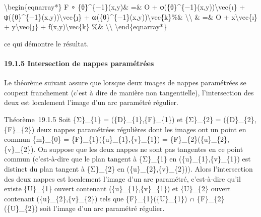 \documentclass[]{article}
\begin{document}
\textbackslash{}begin\{eqnarray*\} F ∘ \{θ\}\^{}\{−1\}(x,y)\& =\& O +
φ(\{θ\}\^{}\{−1\}(x,y))\textbackslash{}vec\{ı\} +
ψ(\{θ\}\^{}\{−1\}(x,y))\textbackslash{}vec\{ȷ\} +
ω(\{θ\}\^{}\{−1\}(x,y))\textbackslash{}vec\{k\}\%\&
\textbackslash{}\textbackslash{} \& =\& O + x\textbackslash{}vec\{ı\} +
y\textbackslash{}vec\{ȷ\} + f(x,y)\textbackslash{}vec\{k\} \%\&
\textbackslash{}\textbackslash{} \textbackslash{}end\{eqnarray*\}

ce qui démontre le résultat.

\paragraph{19.1.5 Intersection de nappes paramétrées}

Le théorème suivant assure que lorsque deux images de nappes paramétrées
se coupent franchement (c'est à dire de manière non tangentielle),
l'intersection des deux est localement l'image d'un arc paramétré
régulier.

Théorème~19.1.5 Soit \{Σ\}\_\{1\} = (\{D\}\_\{1\},\{F\}\_\{1\}) et
\{Σ\}\_\{2\} = (\{D\}\_\{2\},\{F\}\_\{2\}) deux nappes paramétrées
régulières dont les images ont un point en commun \{m\}\_\{0\} =
\{F\}\_\{1\}(\{u\}\_\{1\},\{v\}\_\{1\}) =
\{F\}\_\{2\}(\{u\}\_\{2\},\{v\}\_\{2\}). On suppose que les deux nappes
ne sont pas tangentes en ce point commun (c'est-à-dire que le plan
tangent à \{Σ\}\_\{1\} en (\{u\}\_\{1\},\{v\}\_\{1\}) est distinct du
plan tangent à \{Σ\}\_\{2\} en (\{u\}\_\{2\},\{v\}\_\{2\})). Alors
l'intersection des deux nappes est localement l'image d'un arc
paramétré, c'est-à-dire qu'il existe \{U\}\_\{1\} ouvert contenant
(\{u\}\_\{1\},\{v\}\_\{1\}) et \{U\}\_\{2\} ouvert contenant
(\{u\}\_\{2\},\{v\}\_\{2\}) tels que \{F\}\_\{1\}(\{U\}\_\{1\}) ∩
\{F\}\_\{2\}(\{U\}\_\{2\}) soit l'image d'un arc paramétré régulier.
\end{document}
